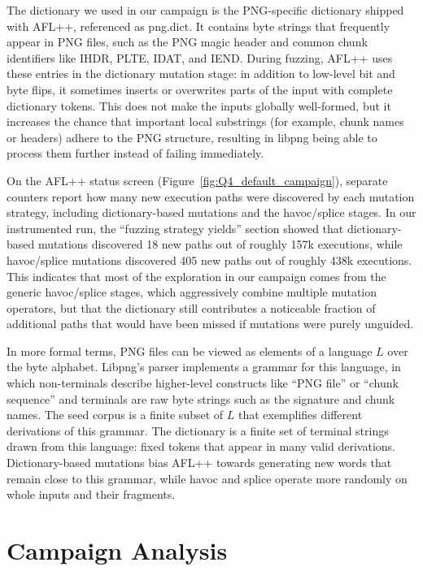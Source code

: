 The dictionary we used in our campaign is the PNG-specific dictionary shipped with AFL++, referenced as png.dict. It contains byte strings that frequently appear in PNG files, such as the PNG magic header and common chunk identifiers like IHDR, PLTE, IDAT, and IEND. During fuzzing, AFL++ uses these entries in the dictionary mutation stage: in addition to low-level bit and byte flips, it sometimes inserts or overwrites parts of the input with complete dictionary tokens. This does not make the inputs globally well-formed, but it increases the chance that important local substrings (for example, chunk names or headers) adhere to the PNG structure, resulting in libpng being able to process them further instead of failing immediately.

On the AFL++ status screen (Figure~\ref{fig:Q4_default_campaign}), separate counters report how many new execution paths were discovered by each mutation strategy, including dictionary-based mutations and the havoc/splice stages. In our instrumented run, the “fuzzing strategy yields” section showed that dictionary-based mutations discovered 18 new paths out of roughly 157k executions, while havoc/splice mutations discovered 405 new paths out of roughly 438k executions. This indicates that most of the exploration in our campaign comes from the generic havoc/splice stages, which aggressively combine multiple mutation operators, but that the dictionary still contributes a noticeable fraction of additional paths that would have been missed if mutations were purely unguided.

In more formal terms, PNG files can be viewed as elements of a language $L$ over the byte alphabet. Libpng’s parser implements a grammar for this language, in which non-terminals describe higher-level constructs like “PNG file” or “chunk sequence” and terminals are raw byte strings such as the signature and chunk names. The seed corpus is a finite subset of $L$ that exemplifies different derivations of this grammar. The dictionary is a finite set of terminal strings drawn from this language: fixed tokens that appear in many valid derivations. Dictionary-based mutations bias AFL++ towards generating new words that remain close to this grammar, while havoc and splice operate more randomly on whole inputs and their fragments.
\section{Campaign Analysis}

